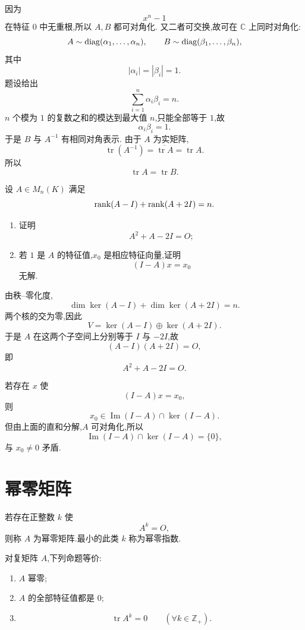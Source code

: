 \begin{solution}
因为
\[
x^n-1
\]
在特征 $0$ 中无重根,所以 $A,B$ 都可对角化.
又二者可交换,故可在 $\mathbb{C}$ 上同时对角化:
\[
A\sim\operatorname{diag}(\alpha_1,\ldots,\alpha_n),
\qquad
B\sim\operatorname{diag}(\beta_1,\ldots,\beta_n),
\]
其中
\[
|\alpha_i|=|\beta_i|=1.
\]
题设给出
\[
\displaystyle\sum_{i=1}^{n}\alpha_i\beta_i=n.
\]
$n$ 个模为 $1$ 的复数之和的模达到最大值 $n$,只能全部等于 $1$,故
\[
\alpha_i\beta_i=1.
\]
于是 $B$ 与 $A^{-1}$ 有相同对角表示.
由于 $A$ 为实矩阵,
\[
\operatorname{tr}(A^{-1})
=
\overline{\operatorname{tr}A}
=
\operatorname{tr}A.
\]
所以
\[
\boxed{\operatorname{tr}A=\operatorname{tr}B}.
\]
\end{solution}


\begin{example}
设 $A\in M_n(K)$ 满足
\[
\operatorname{rank}(A-I)+\operatorname{rank}(A+2I)=n.
\]
\begin{enumerate}
    \item 证明
    \[
    A^2+A-2I=O;
    \]
    \item 若 $1$ 是 $A$ 的特征值,$x_0$ 是相应特征向量,证明
    \[
    (I-A)x=x_0
    \]
    无解.
\end{enumerate}
\end{example}
\exampleblank

\begin{solution}
由秩--零化度,
\[
\dim\ker(A-I)+\dim\ker(A+2I)=n.
\]
两个核的交为零,因此
\[
V=\ker(A-I)\oplus\ker(A+2I).
\]
于是 $A$ 在这两个子空间上分别等于 $I$ 与 $-2I$,故
\[
(A-I)(A+2I)=O,
\]
即
\[
\boxed{A^2+A-2I=O}.
\]

若存在 $x$ 使
\[
(I-A)x=x_0,
\]
则
\[
x_0\in\operatorname{Im}(I-A)\cap\ker(I-A).
\]
但由上面的直和分解,$A$ 可对角化,所以
\[
\operatorname{Im}(I-A)\cap\ker(I-A)=\{0\},
\]
与 $x_0\neq0$ 矛盾.
\end{solution}


\newpage

\section{幂零矩阵}

\begin{definition}
若存在正整数 $k$ 使
\[
A^k=O,
\]
则称 $A$ 为幂零矩阵.最小的此类 $k$ 称为幂零指数.
\end{definition}

\begin{proposition}[\markstar]
对复矩阵 $A$,下列命题等价:
\begin{enumerate}
    \item $A$ 幂零;
    \item $A$ 的全部特征值都是 $0$;
    \item
    \[
    \operatorname{tr}A^k=0
    \qquad(\forall k\in\mathbb{Z}_+).
    \]
\end{enumerate}
\end{proposition}



